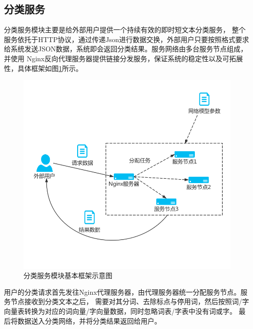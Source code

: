 \documentclass{standalone}
\begin{document}
\subsection{分类服务}
分类服务模块主要是给外部用户提供一个持续有效的即时短文本分类服务，
整个服务依托于HTTP协议，通过传递Json进行数据交换，外部用户只要按照格式要求
给系统发送JSON数据，系统即会返回分类结果。服务网络由多台服务节点组成，并使用
Nginx反向代理服务器提供链接分发服务，保证系统的稳定性以及可拓展性，具体框架如图\ref{server_chart}所示。
\begin{figure}[!hbp]
    \includegraphics[scale=0.4]{picture/server_chart.png}
    \caption{分类服务模块基本框架示意图}
    \label{server_chart}
\end{figure}

用户的分类请求首先发往Nginx代理服务器，由代理服务器统一分配服务节点。服务节点接收到分类文本之后，
需要对其分词、去除标点与停用词，然后按照词/字向量表转换为对应的词向量/字向量数据，同时忽略词表/字表中没有词或字。
最后将数据送入分类网络，并将分类结果返回给用户。
\end{document}

